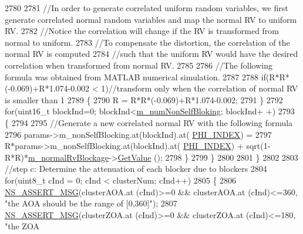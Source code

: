 \begin{DoxyCode}
2780 
2781                         \textcolor{comment}{//In order to generate correlated uniform random variables, we first generate
       correlated normal random variables and map the normal RV to uniform RV.}
2782                         \textcolor{comment}{//Notice the correlation will change if the RV is transformed from normal to
       uniform.}
2783                         \textcolor{comment}{//To compensate the distortion, the correlation of the normal RV is computed}
2784                         \textcolor{comment}{//such that the uniform RV would have the desired correlation when transformed from
       normal RV.}
2785 
2786                         \textcolor{comment}{//The following formula was obtained from MATLAB numerical simulation.}
2787 
2788                         \textcolor{keywordflow}{if}(R*R*(-0.069)+R*1.074-0.002 < 1)\textcolor{comment}{//transform only when the correlation of normal
       RV is smaller than 1}
2789                         \{
2790                                 R = R*R*(-0.069)+R*1.074-0.002;
2791                         \}
2792                         \textcolor{keywordflow}{for}(uint16\_t blockInd=0; blockInd<\hyperlink{classns3_1_1MmWave3gppChannel_addfe5e6c9d8e2531fe165ff86461d2d3}{m\_numNonSelfBloking}; blockInd+
      +)
2793                         \{
2794 
2795                                 \textcolor{comment}{//Generate a new correlated normal RV with the following formula}
2796                                 params->m\_nonSelfBlocking.at(blockInd).at(
      \hyperlink{mmwave-3gpp-channel_8h_aac1933f496abe567e4380fc99112f6dc}{PHI\_INDEX}) =
2797                                                 R*params->m\_nonSelfBlocking.at(blockInd).at(
      \hyperlink{mmwave-3gpp-channel_8h_aac1933f496abe567e4380fc99112f6dc}{PHI\_INDEX}) + sqrt(1-R*R)*\hyperlink{classns3_1_1MmWave3gppChannel_a51e89a0f3902e6e377705871c479cf36}{m\_normalRvBlockage}->\hyperlink{classns3_1_1NormalRandomVariable_a0134d131477bc439cc6ff7cbe84b03a9}{GetValue} ();
2798                         \}
2799                 \}
2800 
2801         \}
2802 
2803         \textcolor{comment}{//step c: Determine the attenuation of each blocker due to blockers}
2804         \textcolor{keywordflow}{for}(uint8\_t cInd = 0; cInd < clusterNum; cInd++)
2805         \{
2806                 \hyperlink{assert_8h_aff5ece9066c74e681e74999856f08539}{NS\_ASSERT\_MSG}(clusterAOA.at (cInd)>=0 && clusterAOA.at (cInd)<=360, \textcolor{stringliteral}{"the AOA
       should be the range of [0,360]"});
2807                 \hyperlink{assert_8h_aff5ece9066c74e681e74999856f08539}{NS\_ASSERT\_MSG}(clusterZOA.at (cInd)>=0 && clusterZOA.at (cInd)<=180, \textcolor{stringliteral}{"the ZOA
}
\end{DoxyCode}
